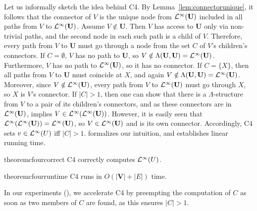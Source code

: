 Let us informally sketch the idea behind C4. By Lemma~\ref{lem:connectorunique}, it follows that the connector of $V$ is the unique node from $\mathcal{L}^{\infty} (\mathbf{U})$ included in all paths from $V$ to $\mathcal{L}^{\infty} (\mathbf{U})$. Assume $V \notin \mathbf{U}$. Then $V$ has access to $\mathbf{U}$ only via non-trivial paths, and the second node in each such path is a child of $V$.
Therefore, every path from $V$ to $\mathbf{U}$ must go through a node from the set $C$ of $V$'s children's connectors.
If $C=\emptyset$, $V$ has no path to $\mathbf{U}$, so $V \notin \Lambda(\mathbf{U},\mathbf{U})=\mathcal{L}^{\infty}(\mathbf{U})$.
Furthermore, $V$ has no path to $\mathcal{L}^{\infty}(\mathbf{U})$, so it has no connector.
If $C=\{X\}$, then all paths from $V$ to $\mathbf{U}$ must coincide at $X$, and again $V \notin \Lambda(\mathbf{U},\mathbf{U})=\mathcal{L}^{\infty}(\mathbf{U})$.
Moreover, since $V \notin \mathcal{L}^{\infty}(\mathbf{U})$, every path from $V$ to $\mathcal{L}^{\infty} (\mathbf{U})$ must go through $X$, so $X$ is $V$'s connector.
If $|C|>1$, then one can show that there is a $\Lambda$-structure from $V$ to a pair of its children's connectors, and as these connectors are in $\mathcal{L}^{\infty}(\mathbf{U})$,  implies $V \in \mathcal{L}^{\infty} (\mathcal{L}^{\infty}(\mathbf{U}))$. However, it is easily seen that $\mathcal{L}^{\infty}(\mathcal{L}^{\infty}(\mathbf{U}))=\mathcal{L}^{\infty}(\mathbf{U})$, so $V \in \mathcal{L}^{\infty}(\mathbf{U})$ and is its own connector.
Accordingly, C4 sets $v \in \mathcal{L}^{\infty} (U)$ iff $|C|>1$.
 formalizes our intuition, and  establishes linear running time.

\begin{restatable}{theorem}{cfourcorrect}
   \label{prop:c4correct}
   C4 correctly computes $\mathcal{L}^{\infty}(U)$.
\end{restatable}
\begin{restatable}{theorem}{cfourruntime}
   \label{prop:c4runtime}
   C4 runs in $O(|\mathbf{V}|+|E|)$ time.
\end{restatable}
In our experiments (), we accelerate C4 by preempting the computation of $C$ as soon as two members of $C$ are found, as this ensures $|C|>1$.
